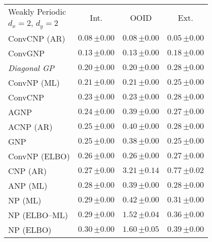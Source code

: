 \begin{tabular}[t]{lccc} 
\toprule 
Weakly Periodic & \multirow{2}{*}{Int.} & \multirow{2}{*}{OOID} & \multirow{2}{*}{Ext.} \\ 
$d_x\!=\!2,\,d_y\!=\!2$ \\ \midrule 
ConvCNP (AR) & $\mathbf{0.08}\,{ \scriptstyle \pm  0.00 }$ & $\mathbf{0.08}\,{ \scriptstyle \pm  0.00 }$ & $\mathbf{0.05}\,{ \scriptstyle \pm  0.00 }$ \\ 
ConvGNP & $0.13\,{ \scriptstyle \pm  0.00 }$ & $0.13\,{ \scriptstyle \pm  0.00 }$ & $0.18\,{ \scriptstyle \pm  0.00 }$ \\ 
{\normalshape \textit{Diagonal GP}} & $0.20\,{ \scriptstyle \pm  0.00 }$ & $0.20\,{ \scriptstyle \pm  0.00 }$ & $0.28\,{ \scriptstyle \pm  0.00 }$ \\ 
ConvNP (ML) & $0.21\,{ \scriptstyle \pm  0.00 }$ & $0.21\,{ \scriptstyle \pm  0.00 }$ & $0.25\,{ \scriptstyle \pm  0.00 }$ \\ 
ConvCNP & $0.23\,{ \scriptstyle \pm  0.00 }$ & $0.23\,{ \scriptstyle \pm  0.00 }$ & $0.28\,{ \scriptstyle \pm  0.00 }$ \\ 
AGNP & $0.24\,{ \scriptstyle \pm  0.00 }$ & $0.39\,{ \scriptstyle \pm  0.00 }$ & $0.27\,{ \scriptstyle \pm  0.00 }$ \\ 
ACNP (AR) & $0.25\,{ \scriptstyle \pm  0.00 }$ & $0.40\,{ \scriptstyle \pm  0.00 }$ & $0.28\,{ \scriptstyle \pm  0.00 }$ \\ 
GNP & $0.25\,{ \scriptstyle \pm  0.00 }$ & $0.38\,{ \scriptstyle \pm  0.00 }$ & $0.25\,{ \scriptstyle \pm  0.00 }$ \\ 
ConvNP (ELBO) & $0.26\,{ \scriptstyle \pm  0.00 }$ & $0.26\,{ \scriptstyle \pm  0.00 }$ & $0.27\,{ \scriptstyle \pm  0.00 }$ \\ 
CNP (AR) & $0.27\,{ \scriptstyle \pm  0.00 }$ & $3.21\,{ \scriptstyle \pm  0.14 }$ & $0.77\,{ \scriptstyle \pm  0.02 }$ \\ 
ANP (ML) & $0.28\,{ \scriptstyle \pm  0.00 }$ & $0.39\,{ \scriptstyle \pm  0.00 }$ & $0.28\,{ \scriptstyle \pm  0.00 }$ \\ 
NP (ML) & $0.29\,{ \scriptstyle \pm  0.00 }$ & $0.42\,{ \scriptstyle \pm  0.00 }$ & $0.31\,{ \scriptstyle \pm  0.00 }$ \\ 
NP (ELBO--ML) & $0.29\,{ \scriptstyle \pm  0.00 }$ & $1.52\,{ \scriptstyle \pm  0.04 }$ & $0.36\,{ \scriptstyle \pm  0.00 }$ \\ 
NP (ELBO) & $0.30\,{ \scriptstyle \pm  0.00 }$ & $1.60\,{ \scriptstyle \pm  0.05 }$ & $0.39\,{ \scriptstyle \pm  0.00 }$ \\ 

\end{tabular}
